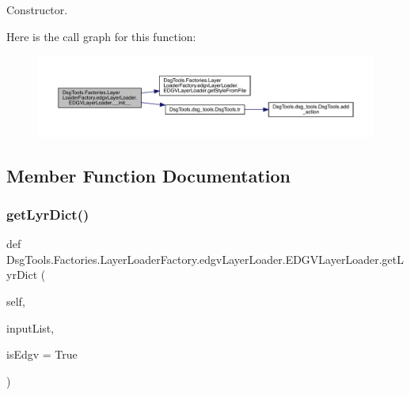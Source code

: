 \begin{DoxyVerb}Constructor.\end{DoxyVerb}
 Here is the call graph for this function\+:
\nopagebreak
\begin{figure}[H]
\begin{center}
\leavevmode
\includegraphics[width=350pt]{class_dsg_tools_1_1_factories_1_1_layer_loader_factory_1_1edgv_layer_loader_1_1_e_d_g_v_layer_loader_a3178f2b62842e74feed9174f16fba2bb_cgraph}
\end{center}
\end{figure}


\subsection{Member Function Documentation}
\mbox{\label{class_dsg_tools_1_1_factories_1_1_layer_loader_factory_1_1edgv_layer_loader_1_1_e_d_g_v_layer_loader_aa97ded5b4d2c3e931133f8d81db56d1e}} 
\subsubsection{\texorpdfstring{get\+Lyr\+Dict()}{getLyrDict()}}
{\footnotesize\ttfamily def Dsg\+Tools.\+Factories.\+Layer\+Loader\+Factory.\+edgv\+Layer\+Loader.\+E\+D\+G\+V\+Layer\+Loader.\+get\+Lyr\+Dict (\begin{DoxyParamCaption}\item[{}]{self,  }\item[{}]{input\+List,  }\item[{}]{is\+Edgv = {\ttfamily True} }\end{DoxyParamCaption})}

